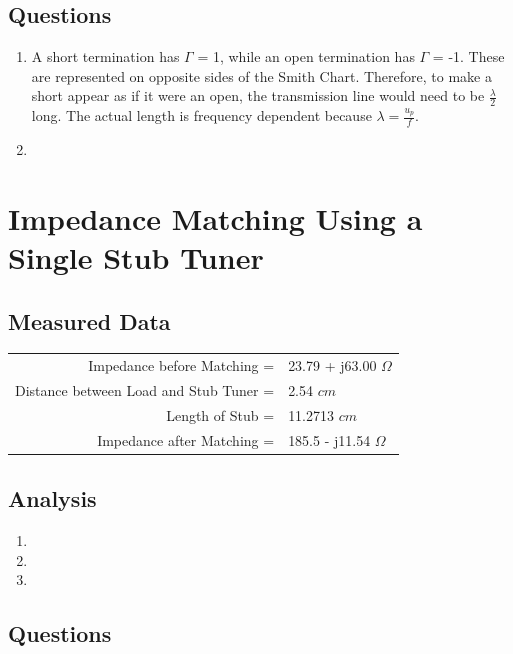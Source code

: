 \documentclass{article}
\begin{document}
\subsection{Questions}

\begin{enumerate}
	\item A short termination has $\Gamma$ = 1, while an open termination has $\Gamma$ = -1. These are represented on opposite sides of the Smith Chart. Therefore, to make a short appear as if it were an open, the transmission line would need to be $\frac{\lambda}{2}$ long. The actual length is frequency dependent because $\lambda = \frac{u_p}{f}$.
	\item
\end{enumerate}


\section{Impedance Matching Using a Single Stub Tuner}

\subsection{Measured Data}

\begin{table}[H]
\centering
	\begin{tabular}{rl}
	Impedance before Matching =   			 & 23.79 + j63.00 $\Omega$  \\
	Distance between Load and Stub Tuner =   & 2.54 $cm$  \\
	Length of Stub =   						 & 11.2713 $cm$  \\
	Impedance after Matching =  			 & 185.5 - j11.54 $\Omega$      
	\end{tabular}
\end{table}

\subsection{Analysis}

\begin{enumerate}
	\item
	\item
	\item
\end{enumerate}

\subsection{Questions}
\end{document}
